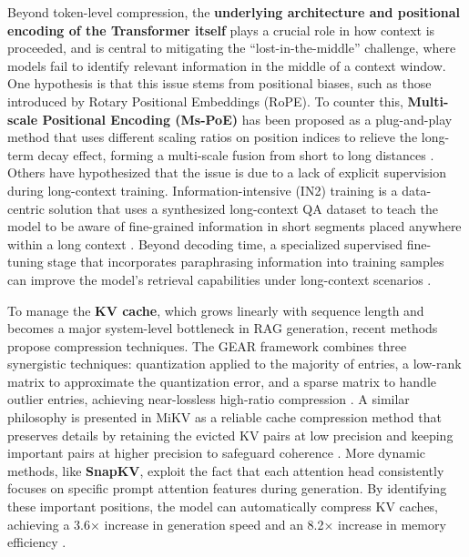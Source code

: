 \documentclass[11pt]{article}
\begin{document}
Beyond token-level compression, the \textbf{underlying architecture and positional encoding of the Transformer itself} plays a crucial role in how context is proceeded, and is central to mitigating the ``lost-in-the-middle'' challenge, where models fail to identify relevant information in the middle of a context window. One hypothesis is that this issue stems from positional biases, such as those introduced by Rotary Positional Embeddings (RoPE). To counter this, \textbf{Multi-scale Positional Encoding (Ms-PoE)} has been proposed as a plug-and-play method that uses different scaling ratios on position indices to relieve the long-term decay effect, forming a multi-scale fusion from short to long distances \cite{ref168}. Others have hypothesized that the issue is due to a lack of explicit supervision during long-context training. Information-intensive (IN2) training is a data-centric solution that uses a synthesized long-context QA dataset to teach the model to be aware of fine-grained information in short segments placed anywhere within a long context \cite{ref169}. Beyond decoding time, a specialized supervised fine-tuning stage that incorporates paraphrasing information into training samples can improve the model's retrieval capabilities under long-context scenarios \cite{ref170}.

To manage the \textbf{KV cache}, which grows linearly with sequence length and becomes a major system-level bottleneck in RAG generation, recent methods propose compression techniques. The GEAR framework combines three synergistic techniques: quantization applied to the majority of entries, a low-rank matrix to approximate the quantization error, and a sparse matrix to handle outlier entries, achieving near-lossless high-ratio compression \cite{ref171}. A similar philosophy is presented in MiKV as a reliable cache compression method that preserves details by retaining the evicted KV pairs at low precision and keeping important pairs at higher precision to safeguard coherence \cite{ref172}. More dynamic methods, like \textbf{SnapKV}, exploit the fact that each attention head consistently focuses on specific prompt attention features during generation. By identifying these important positions, the model can automatically compress KV caches, achieving a 3.6× increase in generation speed and an 8.2× increase in memory efficiency \cite{ref173}.
\end{document}
